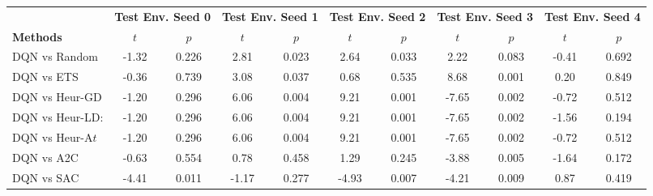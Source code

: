 \begin{tabular}{lcccccccccc}
	\toprule 
	& \multicolumn{2}{c}{\textbf{Test Env. Seed 0}} & \multicolumn{2}{c}{\textbf{Test Env. Seed 1}} & \multicolumn{2}{c}{\textbf{Test Env. Seed 2}} & \multicolumn{2}{c}{\textbf{Test Env. Seed 3}} & \multicolumn{2}{c}{\textbf{Test Env. Seed 4}} \\
	\cmidrule(lr){2-3} \cmidrule(lr){4-5} \cmidrule(lr){6-7} \cmidrule(lr){8-9} \cmidrule(lr){10-11}
	\textbf{Methods} & $t$             & $p$                         & $t$             & $p$                         & $t$              & $p$                        & $t$             & $p$                         & $t$              & $p$                        \\
	\midrule 
	DQN vs Random    & -1.32         & 0.226                  & 2.81          & 0.023                  & 2.64           & 0.033                 & 2.22          & 0.083                  & -0.41          & 0.692                 \\
	DQN vs ETS       & -0.36         & 0.739                  & 3.08          & 0.037                  & 0.68           & 0.535                 & 8.68          & 0.001                  & 0.20           & 0.849                 \\
	DQN vs Heur-GD   & -1.20         & 0.296                  & 6.06          & 0.004                  & 9.21           & 0.001                 & -7.65         & 0.002                  & -0.72          & 0.512                 \\
	DQN vs Heur-LD:  & -1.20         & 0.296                  & 6.06          & 0.004                  & 9.21           & 0.001                 & -7.65         & 0.002                  & -1.56          & 0.194                 \\
	DQN vs Heur-A$t$ & -1.20         & 0.296                  & 6.06          & 0.004                  & 9.21           & 0.001                 & -7.65         & 0.002                  & -0.72          & 0.512                 \\
	DQN vs A2C       & -0.63         & 0.554                  & 0.78          & 0.458                  & 1.29           & 0.245                 & -3.88         & 0.005                  & -1.64          & 0.172                 \\
	DQN vs SAC       & -4.41         & 0.011                  & -1.17         & 0.277                  & -4.93          & 0.007                 & -4.21         & 0.009                  & 0.87           & 0.419                 \\

\end{tabular}
